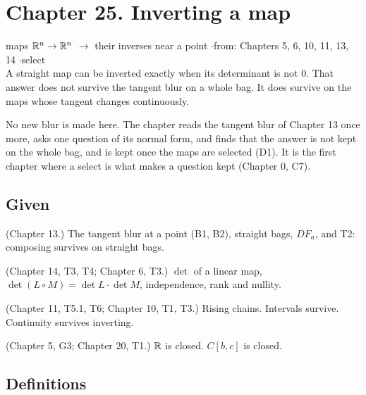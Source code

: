 \newpage

\section*{Chapter 25. Inverting a map}
\begin{center}
{\normalsize maps $\mathbb{R}^n \to \mathbb{R}^n$ $\to$ their inverses near a point \quad$\cdot$\quad from: Chapters 5, 6, 10, 11, 13, 14 \quad$\cdot$\quad select}\\[4pt]
{\small A straight map can be inverted exactly when its determinant is not $0$. That answer does not survive the tangent blur on a whole bag. It does survive on the maps whose tangent changes continuously.}
\end{center}

No new blur is made here. The chapter reads the tangent blur of Chapter 13 once more, asks one question of its normal form, and finds that the answer is not kept on the whole bag, and is kept once the maps are selected (D1). It is the first chapter where a select is what makes a question kept (Chapter 0, C7).

\subsection*{Given}

\begin{lines}
\item[\lab{G1}] (Chapter 13.) The tangent blur at a point (B1, B2), straight bags, $DF_a$, and T2: composing survives on straight bags.
\item[\lab{G2}] (Chapter 14, T3, T4; Chapter 6, T3.) $\det$ of a linear map, $\det(L \circ M) = \det L \cdot \det M$, independence, rank and nullity.
\item[\lab{G3}] (Chapter 11, T5.1, T6; Chapter 10, T1, T3.) Rising chains. Intervals survive. Continuity survives inverting.
\item[\lab{G4}] (Chapter 5, G3; Chapter 20, T1.) $\mathbb{R}$ is closed. $C[b,c]$ is closed.
\end{lines}

\subsection*{Definitions}

